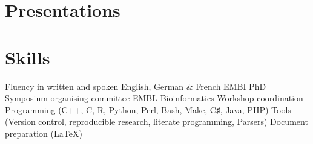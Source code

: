 \documentclass{klmr-cv}
\newcommand*\csharp{C♯}
\newcommand*\cpp{C++}
\begin{document}
\section{Presentations}

\section{Skills}

\begin{itemize}
    \listitem Fluency in written and spoken English, German \& French
    \listitem EMBI PhD Symposium organising committee
    \listitem EMBL Bioinformatics Workshop coordination
    \listitem Programming (\cpp, C, R, Python, Perl, Bash, Make, \csharp, Java, PHP)
    \listitem Tools (Version control, reproducible research, literate
        programming, Parsers)
    \listitem Document preparation (\LaTeX)
\end{itemize}
\end{document}
